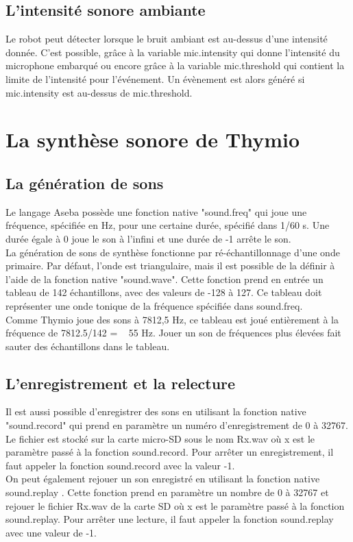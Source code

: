 \documentclass[a4paper, 12pt]{report}
\begin{document}
\subsection{L'intensité sonore ambiante}
Le robot peut détecter lorsque le bruit ambiant est au-dessus d'une intensité donnée. C'est possible, grâce à la variable mic.intensity qui donne l'intensité du microphone embarqué ou encore grâce à la variable mic.threshold qui contient la limite de l'intensité pour l'événement. Un évènement est alors généré si mic.intensity est au-dessus de mic.threshold.\\

\section{La synthèse sonore de Thymio \pageref{thymio}}
\subsection{La génération de sons}
Le langage Aseba \pageref{aseba} possède une fonction native "sound.freq" qui joue une fréquence, spécifiée en Hz, pour une certaine durée, spécifié dans 1/60 s. Une durée égale à 0 joue le son à l'infini et une durée de -1 arrête le son.\\
La génération de sons de synthèse fonctionne par ré-échantillonnage d'une onde primaire. Par défaut, l'onde est triangulaire, mais il est possible de la	définir à l'aide de la fonction native "sound.wave". Cette fonction prend en entrée un tableau de 142 échantillons, avec des valeurs de -128 à 127. Ce tableau doit représenter une onde tonique de la fréquence spécifiée dans sound.freq.\\
 Comme Thymio joue des sons à 7812,5 Hz, ce tableau est joué entièrement à la fréquence de 7812.5/142 = ~ 55 Hz. Jouer un son de fréquences plus élevées fait sauter des échantillons dans le tableau.

\subsection{L'enregistrement et la relecture}
Il est aussi possible d'enregistrer des sons en utilisant la fonction native "sound.record" qui prend en paramètre un numéro d'enregistrement de 0 à 32767. Le fichier est stocké sur la carte micro-SD sous le nom Rx.wav où x est le paramètre passé à la fonction sound.record. Pour arrêter un enregistrement, il faut appeler la fonction sound.record avec la valeur -1.\\
On peut également rejouer un son enregistré en utilisant la fonction native sound.replay . Cette fonction prend en paramètre un nombre de 0 à 32767 et rejouer le fichier Rx.wav de la carte SD où x est le paramètre passé à la fonction sound.replay. Pour arrêter une lecture, il faut appeler la fonction sound.replay avec une valeur de -1.
\end{document}
